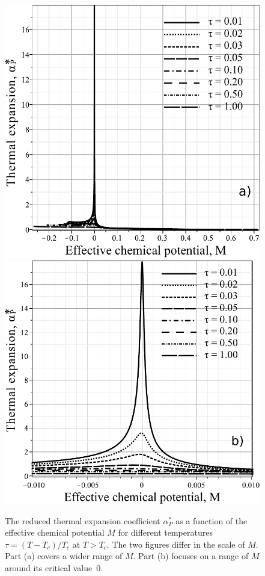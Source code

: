 \begin{figure}[h!]
	\includegraphics[width=\column]{f4b.pdf}
	\includegraphics[width=\column]{f4c.pdf}
	\vskip-3mm
	\caption{The reduced thermal expansion coefficient $\alpha^*_P$ as a function of the effective chemical potential $M$ for different temperatures $\tau = (T - T_c)/T_c$ at $T > T_c$. The two figures differ in the scale of $M$. Part (a) covers a wider range of $M$. Part (b) focuses on a range of $M$ around its critical value~$0$.
	}
	\label{fig4b}
\end{figure}

